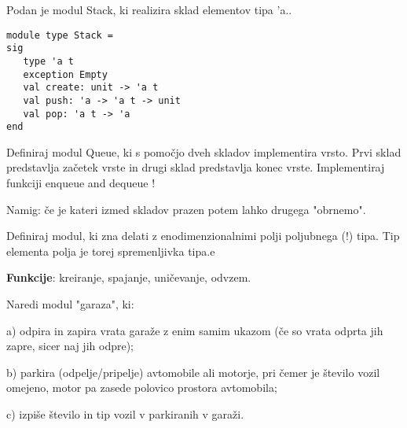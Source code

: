 \begin{ex}
Podan je modul Stack, ki realizira sklad elementov tipa 'a.. 

\begin{lstlisting}
module type Stack = 
sig 
   type 'a t 
   exception Empty 
   val create: unit -> 'a t 
   val push: 'a -> 'a t -> unit 
   val pop: 'a t -> 'a 
end

\end{lstlisting}
Definiraj modul Queue, ki s pomo\v cjo dveh skladov implementira vrsto. Prvi sklad predstavlja za\v cetek vrste in drugi sklad predstavlja konec vrste. Implementiraj funkciji enqueue and dequeue !

Namig: \v ce je kateri izmed skladov prazen potem lahko drugega "obrnemo". 
\end{ex} 



\begin{ex}
Definiraj modul, ki zna delati z enodimenzionalnimi polji poljubnega (!)
tipa. Tip elementa polja je torej spremenljivka tipa.e

\textbf{Funkcije}: kreiranje, spajanje, uni\v cevanje, odvzem.
\end{ex} 
\begin{ex}
Naredi modul "garaza", ki:

a) odpira in zapira vrata gara\v ze z enim samim ukazom (\v ce so vrata
odprta jih zapre, sicer naj jih odpre);

b) parkira (odpelje/pripelje) avtomobile ali motorje, pri \v cemer je
\v stevilo vozil omejeno, motor pa zasede polovico prostora avtomobila;

c) izpi\v se \v stevilo in tip vozil v parkiranih v gara\v zi.
\end{ex}


